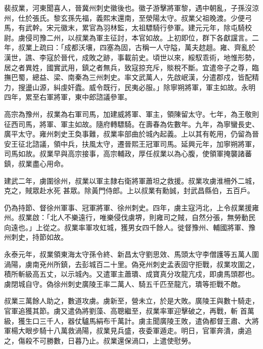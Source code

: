 
\begin{pinyinscope}

 裴叔業，河東聞喜人，晉冀州刺史徽後也。徽子游擊將軍黎，遇中朝亂，子孫沒涼州，仕於張氏。黎玄孫先福，義熙末還南，至滎陽太守。叔業父祖晚渡。少便弓馬，有武幹。宋元徽末，累官為羽林監，太祖驃騎行參軍。建元元年，除屯騎校尉。虜侵司豫二州，以叔業為軍主征討，本官如故。上初即位，群下各獻讜言。二年，叔業上疏曰：「成都沃壤，四塞為固，古稱一人守隘，萬夫趑趄。雍、齊亂於漢世，譙、李寇於晉代，成敗之跡，事載前史。頃世以來，綏馭乖術，地惟形勢，
 居之者異姓，國實武用，鎮之者無兵，致寇掠充斥，賧稅不斷。宜遣帝子之尊，臨撫巴蜀，總益、梁、南秦為三州刺史。率文武萬人，先啟岷漢，分遣郡戍，皆配精力，搜盪山源，糾虔奸蠹。威令既行，民夷必服。」除寧朔將軍，軍主如故。永明四年，累至右軍將軍，東中郎諮議參軍。



 高宗為豫州，叔業為右軍司馬，加建威將軍、軍主，領陳留太守。七年，為王敬則征西司馬，將軍、軍主如故。隨府轉驃騎。在壽春為佐數年。九年，為寧蠻長史、廣平太守。雍州刺史王奐事難，叔業率部曲於城內起義。上以其有乾用，仍留為晉安王征北諮議，領中兵，扶風太守，遷晉熙王冠軍司馬。延興元年，加寧朔將軍，司馬如故。叔業早與高宗接事，高宗輔政，厚任叔業以為心腹，使領軍掩襲諸蕃鎮，叔業盡心用命。



 建武二年，虜圍徐州，叔業以軍主隸右衛將軍蕭坦之救援。叔業攻虜淮柵外二城，克之，賊眾赴水死
 甚眾。除黃門侍郎。上以叔業有勳誠，封武昌縣伯，五百戶。



 仍為持節、督徐州軍事、冠軍將軍、徐州刺史。四年，虜主寇沔北，上令叔業援雍州。叔業啟：「北人不樂遠行，唯樂侵伐虜堺，則雍司之賊，自然分張，無勞動民向遠也。」上從之。叔業率軍攻虹城，獲男女四千餘人。徙督豫州、輔國將軍、豫州刺史，持節如故。



 永泰元年，叔業領東海太守孫令終、新昌太守劉思效、馬頭太守李僧護等五萬人圍渦陽，虜南兗州所鎮，去彭城百二十里。偽兗州刺史孟表固守拒戰，叔業攻圍之，積所斬級高五丈，以示城內。又遣軍主蕭璝、成寶真分攻龍亢戍，即虜馬頭郡也。虜閉城自守。偽徐州刺史廣陵王率二萬人、騎五千匹至龍亢，璝等拒戰不敵。



 叔業三萬餘人助之，數道攻虜。虜新至，營未立，於是大敗。廣陵王與數十騎走，官軍追獲其節。虜又遣偽將劉藻、高聰繼至，叔業率軍迎擊破之，再戰，斬
 首萬級，獲生口三千人，器仗驢馬絹布千萬計。虜主聞廣陵王敗，遣偽都督王肅、大將軍楊大眼步騎十八萬救渦陽，叔業見兵盛，夜委軍遁走。明日，官軍奔潰，虜追之，傷殺不可勝數，日暮乃止。叔業還保渦口，上遣使慰勞。




\end{pinyinscope}
